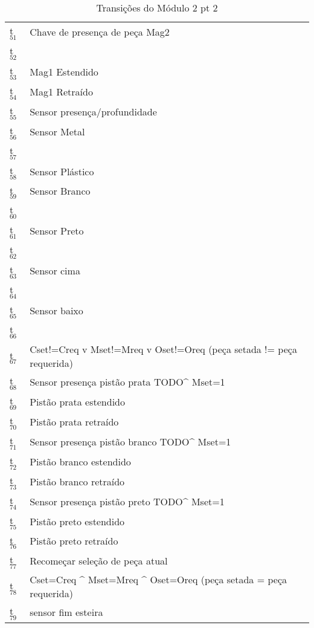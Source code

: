 \documentclass[11pt]{article}
\begin{document}
\begin{table}[htb]
\caption{Transições do Módulo 2 pt 2}
\centering
\begin{tabular}{ll}
t$_{\text{51}}$ & Chave de presença de peça Mag2\\
t$_{\text{52}}$ & \\
t$_{\text{53}}$ & Mag1 Estendido\\
t$_{\text{54}}$ & Mag1 Retraído\\
t$_{\text{55}}$ & Sensor presença/profundidade\\
t$_{\text{56}}$ & Sensor Metal\\
t$_{\text{57}}$ & \\
t$_{\text{58}}$ & Sensor Plástico\\
t$_{\text{59}}$ & Sensor Branco\\
t$_{\text{60}}$ & \\
t$_{\text{61}}$ & Sensor Preto\\
t$_{\text{62}}$ & \\
t$_{\text{63}}$ & Sensor cima\\
t$_{\text{64}}$ & \\
t$_{\text{65}}$ & Sensor baixo\\
t$_{\text{66}}$ & \\
t$_{\text{67}}$ & Cset!=Creq v Mset!=Mreq v Oset!=Oreq (peça setada != peça requerida)\\
t$_{\text{68}}$ & Sensor presença pistão prata TODO\^{} Mset=1\\
t$_{\text{69}}$ & Pistão prata estendido\\
t$_{\text{70}}$ & Pistão prata retraído\\
t$_{\text{71}}$ & Sensor presença pistão branco TODO\^{} Mset=1\\
t$_{\text{72}}$ & Pistão branco estendido\\
t$_{\text{73}}$ & Pistão branco retraído\\
t$_{\text{74}}$ & Sensor presença pistão preto TODO\^{} Mset=1\\
t$_{\text{75}}$ & Pistão preto estendido\\
t$_{\text{76}}$ & Pistão preto retraído\\
t$_{\text{77}}$ & Recomeçar seleção de peça atual\\
t$_{\text{78}}$ & Cset=Creq \^{} Mset=Mreq \^{} Oset=Oreq (peça setada = peça requerida)\\
t$_{\text{79}}$ & sensor fim esteira\\
\end{tabular}
\end{table}
\end{document}
